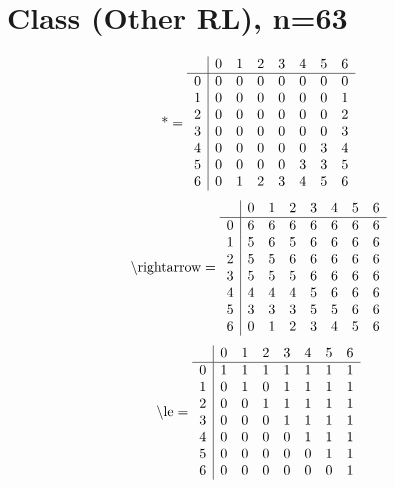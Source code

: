 \documentclass[11pt]{article}
\begin{document}
\section{Class (Other RL), n=63}
\[\text{*} = 
\begin{array}{r | r r r r r r r}
 & 0 & 1 & 2 & 3 & 4 & 5 & 6 \\ \hline
0 & 0 & 0 & 0 & 0 & 0 & 0 & 0 \\
1 & 0 & 0 & 0 & 0 & 0 & 0 & 1 \\
2 & 0 & 0 & 0 & 0 & 0 & 0 & 2 \\
3 & 0 & 0 & 0 & 0 & 0 & 0 & 3 \\
4 & 0 & 0 & 0 & 0 & 0 & 3 & 4 \\
5 & 0 & 0 & 0 & 0 & 3 & 3 & 5 \\
6 & 0 & 1 & 2 & 3 & 4 & 5 & 6 \\
\end{array}
\]
\[\text{\textbackslash rightarrow} = 
\begin{array}{r | r r r r r r r}
 & 0 & 1 & 2 & 3 & 4 & 5 & 6 \\ \hline
0 & 6 & 6 & 6 & 6 & 6 & 6 & 6 \\
1 & 5 & 6 & 5 & 6 & 6 & 6 & 6 \\
2 & 5 & 5 & 6 & 6 & 6 & 6 & 6 \\
3 & 5 & 5 & 5 & 6 & 6 & 6 & 6 \\
4 & 4 & 4 & 4 & 5 & 6 & 6 & 6 \\
5 & 3 & 3 & 3 & 5 & 5 & 6 & 6 \\
6 & 0 & 1 & 2 & 3 & 4 & 5 & 6 \\
\end{array}
\]
\[\text{\textbackslash le} = 
\begin{array}{r | r r r r r r r}
 & 0 & 1 & 2 & 3 & 4 & 5 & 6 \\ \hline
0 & 1 & 1 & 1 & 1 & 1 & 1 & 1 \\
1 & 0 & 1 & 0 & 1 & 1 & 1 & 1 \\
2 & 0 & 0 & 1 & 1 & 1 & 1 & 1 \\
3 & 0 & 0 & 0 & 1 & 1 & 1 & 1 \\
4 & 0 & 0 & 0 & 0 & 1 & 1 & 1 \\
5 & 0 & 0 & 0 & 0 & 0 & 1 & 1 \\
6 & 0 & 0 & 0 & 0 & 0 & 0 & 1 \\
\end{array}
\]
\end{document}
